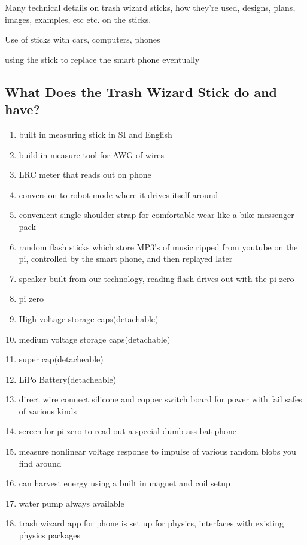 Many technical details on trash wizard sticks, how they're used,
designs, plans, images, examples, etc etc. on the sticks.

Use of sticks with cars, computers, phones

using the stick to replace the smart phone eventually

\subsection{What Does the Trash Wizard Stick do and
have?}\label{what-does-the-trash-wizard-stick-do-and-have}

\begin{enumerate}
\def\labelenumi{\arabic{enumi}.}
\tightlist
\item
  built in measuring stick in SI and English
\item
  build in measure tool for AWG of wires
\item
  LRC meter that reads out on phone
\item
  conversion to robot mode where it drives itself around
\item
  convenient single shoulder strap for comfortable wear like a bike
  messenger pack
\item
  random flash sticks which store MP3's of music ripped from youtube on
  the pi, controlled by the smart phone, and then replayed later
\item
  speaker built from our technology, reading flash drives out with the
  pi zero
\item
  pi zero
\item
  High voltage storage caps(detachable)
\item
  medium voltage storage caps(detachable)
\item
  super cap(detacheable)
\item
  LiPo Battery(detacheable)
\item
  direct wire connect silicone and copper switch board for power with
  fail safes of various kinds
\item
  screen for pi zero to read out a special dumb ass bat phone
\item
  measure nonlinear voltage response to impulse of various random blobs
  you find around
\item
  can harvest energy using a built in magnet and coil setup
\item
  water pump always available
\item
  trash wizard app for phone is set up for physics, interfaces with
  existing physics packages
\end{enumerate}

